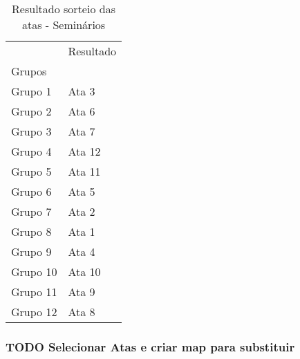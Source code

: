 \documentclass[11pt]{article}
\begin{document}
\begin{table}
\centering
\caption{Resultado sorteio das atas - Seminários}
\begin{tabular}{ll}
\toprule
{} & Resultado \\
Grupos   &           \\
\midrule
Grupo 1  &     Ata 3 \\
Grupo 2  &     Ata 6 \\
Grupo 3  &     Ata 7 \\
Grupo 4  &    Ata 12 \\
Grupo 5  &    Ata 11 \\
Grupo 6  &     Ata 5 \\
Grupo 7  &     Ata 2 \\
Grupo 8  &     Ata 1 \\
Grupo 9  &     Ata 4 \\
Grupo 10 &    Ata 10 \\
Grupo 11 &     Ata 9 \\
Grupo 12 &     Ata 8 \\
\bottomrule
\end{tabular}
\end{table}


\subsubsection{{\bfseries\sffamily TODO} Selecionar Atas e criar map para substituir}
\label{sec:org26b517c}
\end{document}
